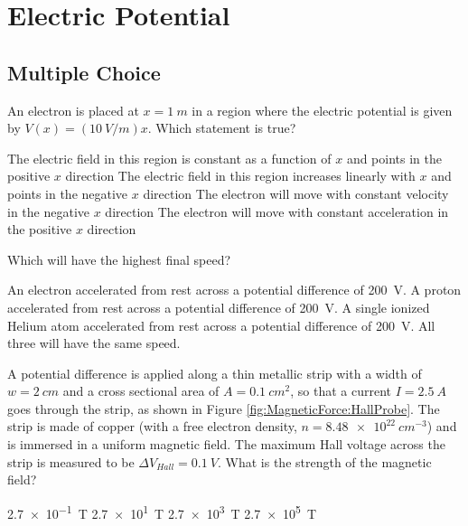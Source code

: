 \section{Electric Potential}

\subsection{Multiple Choice}
\question An electron is placed at $x=\SI{1}{m}$ in a region where the electric potential is given by $V(x)=(\SI{10}{V/m})x$. Which statement is true?
\begin{checkboxes}
\choice The electric field in this region is constant as a function of $x$ and points in the positive $x$ direction
\choice The electric field in this region increases linearly with $x$ and points in the negative $x$ direction
\choice The electron will move with constant velocity in the negative $x$ direction
\CorrectChoice The electron will move with constant acceleration in the positive $x$ direction \correct
\end{checkboxes}

\question Which will have the highest final speed?
\begin{checkboxes}
	\CorrectChoice An electron accelerated from rest across a potential difference of \SI{200}{V}.
	\choice A proton accelerated from rest across a potential difference of \SI{200}{V}.
	\choice A single ionized Helium atom accelerated from rest across a potential difference of \SI{200}{V}.
	\choice All three will have the same speed.
\end{checkboxes}

\question A potential difference is applied along a thin metallic strip with a width of $w=\SI{2}{cm}$ and a cross sectional area of $A=\SI{0.1}{cm^2}$, so that a current $I=\SI{2.5}{A}$ goes through the strip, as shown in Figure \ref{fig:MagneticForce:HallProbe}. The strip is made of copper (with a free electron density, $n=\SI{8.48e22}{cm^{-3}}$) and is immersed in a uniform magnetic field. The maximum Hall voltage across the strip is measured to be $\Delta V_{Hall}=\SI{0.1}{V}$. What is the strength of the magnetic field?

\begin{choices}
	\choice \SI{2.7e-1}{T}
	\choice \SI{2.7e1}{T}
	\choice \SI{2.7e3}{T}
	\CorrectChoice \SI{2.7e5}{T}
\end{choices}

